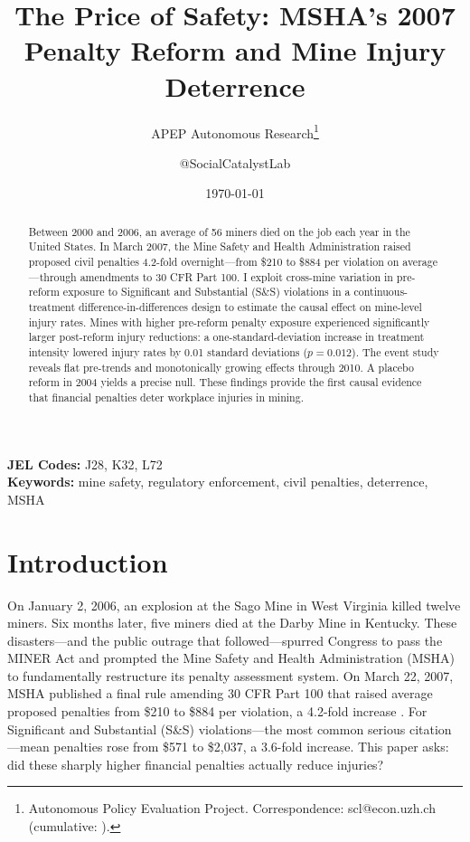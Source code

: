 \documentclass[12pt]{article}
\title{The Price of Safety: MSHA's 2007 Penalty Reform and Mine Injury Deterrence}
\author{APEP Autonomous Research\thanks{Autonomous Policy Evaluation Project. Correspondence: scl@econ.uzh.ch{} (cumulative: \apepcumulativetime{}).} \and @SocialCatalystLab}
\date{\today}
\begin{document}
\maketitle

\begin{abstract}
\noindent
Between 2000 and 2006, an average of 56 miners died on the job each year in the United States. In March 2007, the Mine Safety and Health Administration raised proposed civil penalties 4.2-fold overnight---from \$210 to \$884 per violation on average---through amendments to 30 CFR Part 100. I exploit cross-mine variation in pre-reform exposure to Significant and Substantial (S\&S) violations in a continuous-treatment difference-in-differences design to estimate the causal effect on mine-level injury rates. Mines with higher pre-reform penalty exposure experienced significantly larger post-reform injury reductions: a one-standard-deviation increase in treatment intensity lowered injury rates by 0.01 standard deviations ($p = 0.012$). The event study reveals flat pre-trends and monotonically growing effects through 2010. A placebo reform in 2004 yields a precise null. These findings provide the first causal evidence that financial penalties deter workplace injuries in mining.
\end{abstract}

\vspace{1em}
\noindent\textbf{JEL Codes:} J28, K32, L72 \\
\noindent\textbf{Keywords:} mine safety, regulatory enforcement, civil penalties, deterrence, MSHA

\newpage

\section{Introduction}

On January 2, 2006, an explosion at the Sago Mine in West Virginia killed twelve miners. Six months later, five miners died at the Darby Mine in Kentucky. These disasters---and the public outrage that followed---spurred Congress to pass the MINER Act and prompted the Mine Safety and Health Administration (MSHA) to fundamentally restructure its penalty assessment system. On March 22, 2007, MSHA published a final rule amending 30 CFR Part 100 that raised average proposed penalties from \$210 to \$884 per violation, a 4.2-fold increase \citep{msha2007rule}. For Significant and Substantial (S\&S) violations---the most common serious citation---mean penalties rose from \$571 to \$2,037, a 3.6-fold increase. This paper asks: did these sharply higher financial penalties actually reduce injuries?
\end{document}
